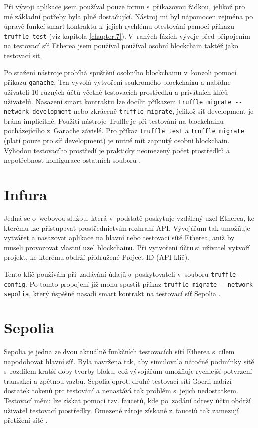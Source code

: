 Při vývoji aplikace jsem používal pouze formu s~příkazovou řádkou, jelikož pro mé základní potřeby byla plně dostačující. Nástroj mi byl nápomocen zejména po úpravě funkcí smart kontraktu k~jejich rychlému otestování pomocí příkazu \texttt{truffle test} (viz kapitola \ref{chapter:7}). V~raných fázích vývoje před připojením na testovací síť Etherea jsem používal používal osobní blockchain taktéž jako testovací síť. 

Po stažení nástroje probíhá spuštění osobního blockchainu v~konzoli pomocí příkazu \texttt{ganache}. Ten vyvolá vytvoření soukromého blockchainu a nabídne uživateli 10 různých účtů včetně testovacích prostředků a privátních klíčů uživatelů. Nasazení smart kontraktu lze docílit příkazem \texttt{truffle migrate -{}-network development} nebo zkráceně \texttt{truffle migrate}, jelikož síť development je brána implicitně. Použití nástroje Truffle je při testování na blockchainu pocházejícího z~Ganache závislé. Pro příkaz \texttt{truffle test} a \texttt{truffle migrate} (platí pouze pro síť development) je nutné mít zapnutý osobní blockchain. Výhodou testovacího prostředí je prakticky neomezený počet prostředků a nepotřebnost konfigurace ostatních souborů \cite{ganache}.
 
\section{Infura}
\label{infura}
Jedná se o~webovou službu, která v~podstatě poskytuje vzdálený uzel Etherea, ke kterému lze přistupovat prostřednictvím rozhraní API. Vývojářům tak umožňuje vytvářet a nasazovat aplikace na hlavní nebo testovací sítě Etherea, aniž by museli provozovat vlastní uzel blockchainu. Při vytvoření účtu si uživatel vytvoří projekt, ke kterému obdrží přidružené Project ID (API klíč).

Tento klíč používám při~zadávání údajů o~poskytovateli v~souboru \texttt{truffle-config}. Po tomto propojení již mohu spustit příkaz \texttt{truffle migrate -{}-network sepolia}, který úspěšně nasadí smart kontrakt na testovací síť Sepolia \cite{infura}.

\section{Sepolia}
\label{sepolia}
Sepolia je jedna ze dvou aktuálně funkčních testovacích sítí Etherea s~cílem napodobovat hlavní síť. Byla navržena tak, aby simulovala náročné podmínky sítě s~rozdílem kratší doby tvorby bloku, což vývojářům umožňuje rychlejší potvrzení transakcí a zpětnou vazbu. Sepolia oproti druhé testovací síti Goerli nabízí dostatek tokenů pro testování a nenastává tak problém s~jejich nedostatkem. Testovací měnu lze získat pomocí tzv. faucetů, kde po~zadání adresy účtu obdrží uživatel testovací prostředky. Omezené zdroje získané z~faucetů tak zamezují přetížení sítě \cite{sepolia}.

